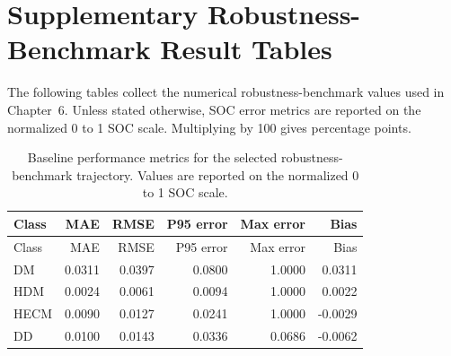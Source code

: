 \documentclass[
    a4paper,
    12pt,
    titlepage,
    bibliography=totoc,
    twoside=on,
    parskip=false,
    numbers=noenddot,
    cleardoublepage=empty,
    DIV=12,
    BCOR=12.0mm,
    headheight=36pt,
    headings=openright
]{scrreprt}
\begin{document}
\section{Supplementary Robustness-Benchmark Result Tables}
The following tables collect the numerical robustness-benchmark values used in Chapter~6. Unless stated otherwise, SOC error metrics are reported on the normalized 0 to 1 SOC scale. Multiplying by 100 gives percentage points.

\begingroup
\scriptsize
\setlength{\tabcolsep}{3pt}

\begin{longtable}{lrrrrr}
\caption[Baseline metrics for the robustness benchmark.]{Baseline performance metrics for the selected robustness-benchmark trajectory. Values are reported on the normalized 0 to 1 SOC scale.}\label{tab:robustness_appendix_baseline_metrics}\\
\toprule
Class & MAE & RMSE & P95 error & Max error & Bias \\
\midrule
\endfirsthead
\toprule
Class & MAE & RMSE & P95 error & Max error & Bias \\
\midrule
\endhead
DM & 0.0311 & 0.0397 & 0.0800 & 1.0000 & 0.0311 \\
HDM & 0.0024 & 0.0061 & 0.0094 & 1.0000 & 0.0022 \\
HECM & 0.0090 & 0.0127 & 0.0241 & 1.0000 & -0.0029 \\
DD & 0.0100 & 0.0143 & 0.0336 & 0.0686 & -0.0062 \\
\bottomrule
\end{longtable}
\end{document}
